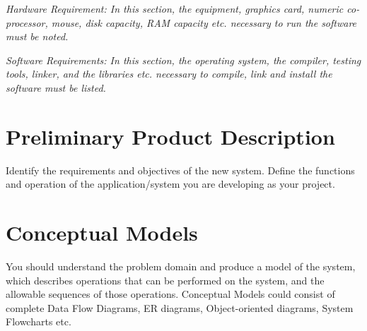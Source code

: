 \textit{Hardware Requirement: In this section, the equipment, graphics card, numeric co-processor, mouse, disk capacity, RAM capacity etc. necessary to run the software must be noted.}

\textit{Software Requirements: In this section, the operating system, the compiler, testing tools, linker, and the libraries etc. necessary to compile, link and install the software must be listed.}

\section{Preliminary Product Description}
Identify the requirements and objectives of the new system. Define the functions and operation of the application/system you are developing as your project.

\section{Conceptual Models}
You should understand the problem domain and produce a model of the system, which describes operations that can be performed on the system, and the allowable sequences of those operations. Conceptual Models could consist of complete Data Flow Diagrams, ER diagrams, Object-oriented diagrams, System Flowcharts etc.
